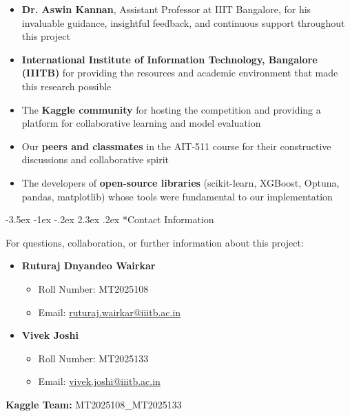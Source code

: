 \documentclass[12pt,a4paper]{article}
\makeatletter
\renewcommand{\section}{\@startsection{section}{1}{\z@}%
                                   {-3.5ex \@plus -1ex \@minus -.2ex}%
                                   {2.3ex \@plus .2ex}%
                                   {\normalfont\Large\bfseries\vspace{0.5\baselineskip}}}
\makeatother
\begin{document}
\begin{itemize}
    \item \textbf{Dr. Aswin Kannan}, Assistant Professor at IIIT Bangalore, for his invaluable guidance, insightful feedback, and continuous support throughout this project
    \item \textbf{International Institute of Information Technology, Bangalore (IIITB)} for providing the resources and academic environment that made this research possible
    \item The \textbf{Kaggle community} for hosting the competition and providing a platform for collaborative learning and model evaluation
    \item Our \textbf{peers and classmates} in the AIT-511 course for their constructive discussions and collaborative spirit
    \item The developers of \textbf{open-source libraries} (scikit-learn, XGBoost, Optuna, pandas, matplotlib) whose tools were fundamental to our implementation
\end{itemize}

\vspace{1cm}

\section*{Contact Information}

For questions, collaboration, or further information about this project:

\begin{itemize}
    \item \textbf{Ruturaj Dnyandeo Wairkar}
    \begin{itemize}
        \item Roll Number: MT2025108
        \item Email: \href{mailto:ruturaj.wairkar@iiitb.ac.in}{ruturaj.wairkar@iiitb.ac.in}
    \end{itemize}
    
    \item \textbf{Vivek Joshi}
    \begin{itemize}
        \item Roll Number: MT2025133
        \item Email: \href{mailto:vivek.joshi@iiitb.ac.in}{vivek.joshi@iiitb.ac.in}
    \end{itemize}
\end{itemize}

\vspace{1cm}

\begin{center}
\textbf{Kaggle Team:} MT2025108\_MT2025133
\end{center}
\end{document}
